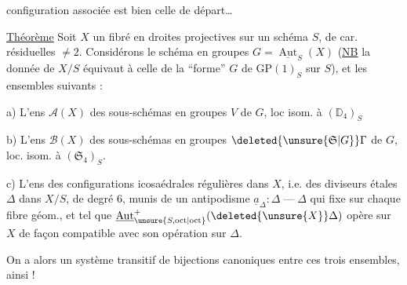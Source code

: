 configuration   associée est bien celle de départ\ldots

\uline{Théorème} \quad Soit \(X\) un fibré en droites projectives sur un schéma \(S\), de car.  résiduelles \(\ne 2\). Considérons le  schéma en groupes \(G=\underline{\operatorname{Aut}}_S(X)\) (\uline{NB} la donnée de \(X/S\) équivaut à celle de la ``forme'' \(G\) de \(\mathrm{GP}(1)_S\) sur \(S\)), et les ensembles suivants :

a) L'ens \(\mathcal A(X)\) des sous-schémas en groupes \(V\) de \(G\), loc isom. à \((\mathbb D_4)_S\)

b) L'ens  \(\mathcal B(X)\) des sous-schémas en groupes \(\deleted{\unsure{\mathfrak S|G}}\Gamma\) de \(G\), loc. isom. à \((\mathfrak S_4)_S\).

c) L'ens des configurations icosaédrales régulières dans \(X\), i.e. des diviseurs étales \(\Delta\) dans \(X/S\), de degré \(6\), munis de un antipodisme \(\underline a_\Delta:\Delta \mathbin{\text{---}} \Delta\) qui   fixe sur chaque fibre géom., et tel que \(\underline{\operatorname{Aut}}_{\unsure{S,\rm oct|\rm oct}}^+(\deleted{\unsure{X}}\Delta)\) opère sur \(X\) de façon compatible avec son opération sur \(\Delta\).

On a alors un système transitif de bijections canoniques entre ces trois ensembles,  ainsi !

